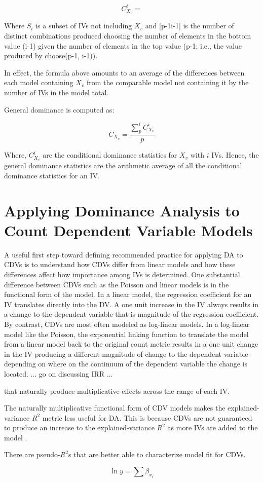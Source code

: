\documentclass[ShortAfour,times,sageapa]{sagej}
\begin{document}
	\begin{equation}
		C^{i}_{X_v} =
	\end{equation}
	
	Where $S_i$ is a subset of IVs not including $X_v$ and [p-1i-1] is the number of distinct combinations produced choosing the number of elements in the bottom value (i-1) given the number of elements in the top value (p-1; i.e., the value produced by choose(p-1, i-1)).
	
	In effect, the formula above amounts to an average of the differences between each model containing $X_v$ from the comparable model not containing it by the number of IVs in the model total.
	
	General dominance is computed as:
	
	\begin{equation}
		C_{X_v} = \frac{\sum_{p}^{i} C^{i}_{X_v}}{p}
	\end{equation}
	
	Where, $C^{i}_{X_v}$ are the conditional dominance statistics for $X_v$ with $i$ IVs. 
	Hence, the general dominance statistics are the arithmetic average of all the conditional dominance statistics for an IV.
	
\section{Applying Dominance Analysis to Count Dependent Variable Models}

	A useful first step toward defining recommended practice for applying DA to CDVs is to understand how CDVs differ from linear models and how these differences affect how importance among IVs is determined.
	One substantial difference between CDVs such as the Poisson and linear models is in the functional form of the model. 
	In a linear model, the regression coefficient for an IV translates directly into the DV.  
	A one unit increase in the IV always results in a change to the dependent variable that is magnitude of the regression coefficient.
	By contrast, CDVs are most often modeled as log-linear models.
  	In a log-linear model like the Poisson, the exponential linking function to translate the model from a linear model back to the original count metric results in a one unit change in the IV producing a different magnitude of change to the dependent variable depending on where on the continuum of the dependent variable the change is located.  ... go on discussing IRR ...

	 that naturally produce multiplicative effects across the range of each IV.

	The naturally multiplicative functional form of CDV models makes the explained-variance $R^2$ metric less useful for DA.  This is because CDVs are not guaranteed to produce an increase to the explained-variance $R^2$ as more IVs are added to the model \cite{}.  
	
	There are pseudo-$R^2$s that are better able to characterize model fit for CDVs.  
	
	
	\begin{equation}
		\ln{y} = \sum{\beta_{x_i}}
	\end{equation}
	
\end{document}
